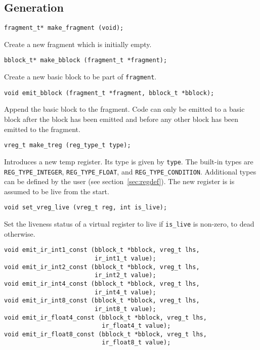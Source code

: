 \documentclass{article}
\newcommand{\cc}[1]{\texttt{#1}} %
\begin{document}
\subsection{Generation}

\begin{verbatim}
fragment_t* make_fragment (void);
\end{verbatim}

Create a new fragment which is initially empty.

\begin{verbatim}
bblock_t* make_bblock (fragment_t *fragment);
\end{verbatim}

Create a new basic block to be part of \cc{fragment}.

\begin{verbatim}
void emit_bblock (fragment_t *fragment, bblock_t *bblock);
\end{verbatim}

Append the basic block to the fragment.  Code can only be emitted to a
basic block after the block has been emitted and before any other
block has been emitted to the fragment.

\begin{verbatim}
vreg_t make_treg (reg_type_t type);
\end{verbatim}

Introduces a new temp register.  Its type is given by \cc{type}.  The
built-in types are \cc{REG\_TYPE\_INTEGER}, \cc{REG\_TYPE\_FLOAT}, and
\cc{REG\_TYPE\_CONDITION}.  Additional types can be defined by the user
(see section~\ref{sec:regdef}).  The new register is is assumed to be
live from the start.

\begin{verbatim}
void set_vreg_live (vreg_t reg, int is_live);
\end{verbatim}

Set the liveness status of a virtual register to live if \cc{is\_live}
is non-zero, to dead otherwise.

\begin{verbatim}
void emit_ir_int1_const (bblock_t *bblock, vreg_t lhs,
                         ir_int1_t value);
void emit_ir_int2_const (bblock_t *bblock, vreg_t lhs,
                         ir_int2_t value);
void emit_ir_int4_const (bblock_t *bblock, vreg_t lhs,
                         ir_int4_t value);
void emit_ir_int8_const (bblock_t *bblock, vreg_t lhs,
                         ir_int8_t value);
void emit_ir_float4_const (bblock_t *bblock, vreg_t lhs,
                           ir_float4_t value);
void emit_ir_float8_const (bblock_t *bblock, vreg_t lhs,
                           ir_float8_t value);
\end{verbatim}
\end{document}
